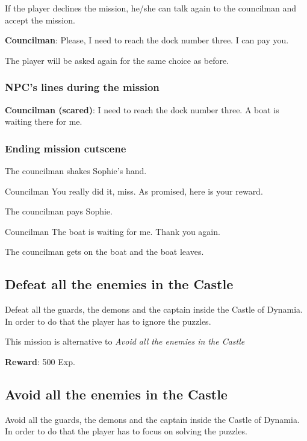 If the player declines the mission, he/she can talk again to the councilman and accept the mission.

\textbf{Councilman}: Please, I need to reach the dock number three. I can pay you.

The player will be asked again for the same choice as before.

\subsubsection*{NPC's lines during the mission}
\textbf{Councilman (scared)}: I need to reach the dock number three. A boat is waiting there for me.

\subsubsection*{Ending mission cutscene}
\begin{screenplay}

The councilman shakes Sophie's hand.

\begin{dialogue}[grateful]{Councilman}
You really did it, miss. As promised, here is your reward.
\end{dialogue}

The councilman pays Sophie.

\begin{dialogue}[continuing]{Councilman}
The boat is waiting for me. Thank you again.
\end{dialogue}

The councilman gets on the boat and the boat leaves.

\end{screenplay}


\subsection{Defeat all the enemies in the Castle}
Defeat all the guards, the demons and the captain inside the Castle of Dynamia. In order to do that the player has to ignore the puzzles.

This mission is alternative to \textit{Avoid all the enemies in the Castle}

\textbf{Reward}: 500 Exp.

\subsection{Avoid all the enemies in the Castle}
Avoid all the guards, the demons and the captain inside the Castle of Dynamia. In order to do that the player has to focus on solving the puzzles.

